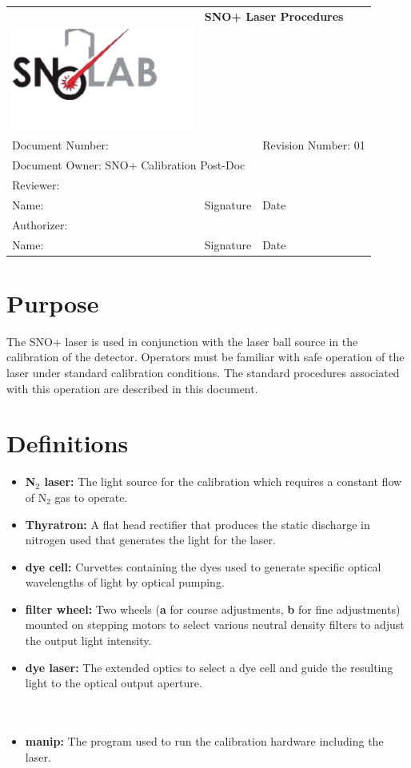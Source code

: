 \documentclass[11pt]{article}
\begin{document}
\begin{tabular}{||l|l|l||}
\hline\hline
& \multicolumn{2}{p{8cm}||}{\bf SNO+ Laser Procedures} \\
\includegraphics[width=6cm]{snolablogo.pdf} & \multicolumn{2}{p{8cm}||}{} \\
\hline
\multicolumn{2}{||p{8.5cm}|}{Document Number:} & Revision Number: 01\\
\hline
\multicolumn{3}{||l||}{Document Owner: SNO+ Calibration Post-Doc} \\
\hline
\multicolumn{3}{||l||}{Reviewer:}\\
\hline
Name: & Signature & Date \\
\hline
\multicolumn{3}{||l||}{Authorizer:}\\
\hline
Name: & Signature & Date \\
\hline\hline
\end{tabular}
\thispagestyle{empty}
\section{Purpose}

The SNO+ laser is used in conjunction with the laser ball source in the calibration of the detector. Operators must be familiar with safe operation of the laser under standard calibration conditions. The standard procedures associated with this operation are described in this document.

\section{Definitions}
\begin{itemize}
\item {\bf N$_{2}$ laser:} The light source for the calibration which requires a constant flow of N$_{2}$ gas to operate.
\item {\bf Thyratron:} A flat head rectifier that produces the static discharge in nitrogen used that generates the light for the laser.
\item {\bf dye cell:} Curvettes containing the dyes used to generate specific optical wavelengths of light by optical pumping. 
\item {\bf filter wheel:} Two wheels ({\bf a} for course adjustments, {\bf b} for fine adjustments) mounted on stepping motors to select various neutral density filters to adjust the output light intensity.
\item {\bf dye laser:} The extended optics to select a dye cell and guide the resulting light to the optical output aperture.\\ \\ \\
\item {\bf manip:} The program used to run the calibration hardware including the laser.\\ 
\end{itemize}
\end{document}
